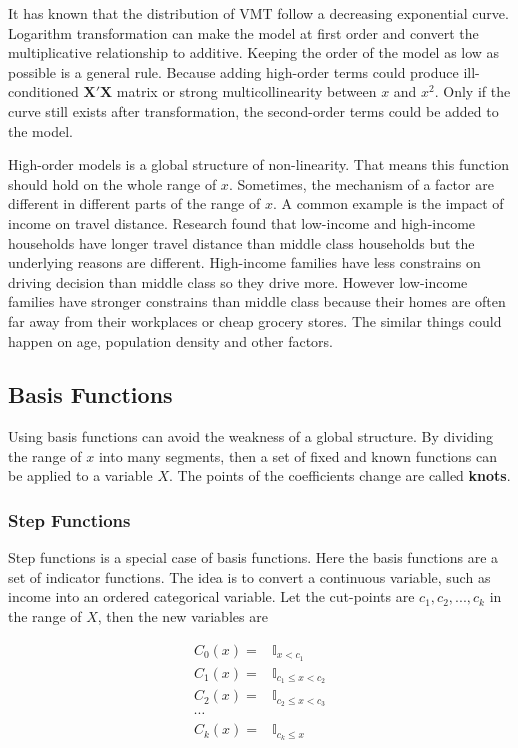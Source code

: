 \documentclass[
  11pt,
  openany]{memoir}
\begin{document}
It has known that the distribution of VMT follow a decreasing exponential curve. Logarithm transformation can make the model at first order and convert the multiplicative relationship to additive.
Keeping the order of the model as low as possible is a general rule.
Because adding high-order terms could produce ill-conditioned \(\mathbf{X'X}\) matrix or strong multicollinearity between \(x\) and \(x^2\).
Only if the curve still exists after transformation, the second-order terms could be added to the model.

High-order models is a global structure of non-linearity. That means this function should hold on the whole range of \(x\).
Sometimes, the mechanism of a factor are different in different parts of the range of \(x\).
A common example is the impact of income on travel distance. Research found that low-income and high-income households have longer travel distance than middle class households but the underlying reasons are different.
High-income families have less constrains on driving decision than middle class so they drive more.
However low-income families have stronger constrains than middle class because their homes are often far away from their workplaces or cheap grocery stores.
The similar things could happen on age, population density and other factors.

\hypertarget{basis-functions}{%
\subsection{Basis Functions}\label{basis-functions}}

Using basis functions can avoid the weakness of a global structure. By dividing the range of \(x\) into many segments, then a set of fixed and known functions can be applied to a variable \(X\).
The points of the coefficients change are called \textbf{knots}.

\hypertarget{step-functions}{%
\subsubsection{Step Functions}\label{step-functions}}

Step functions is a special case of basis functions. Here the basis functions are a set of indicator functions.
The idea is to convert a continuous variable, such as income into an ordered categorical variable. Let the cut-points are \(c_1,c_2,..., c_k\) in the range of \(X\), then the new variables are

\begin{equation}
\begin{split}
C_0(x)=&\mathbb{I}_{x<c_1}\\
C_1(x)=&\mathbb{I}_{c_1\le x<c_2}\\
C_2(x)=&\mathbb{I}_{c_2\le x<c_3}\\
\cdots\\
C_k(x)=&\mathbb{I}_{c_k\le x}\\
\end{split}
\end{equation}
\end{document}
